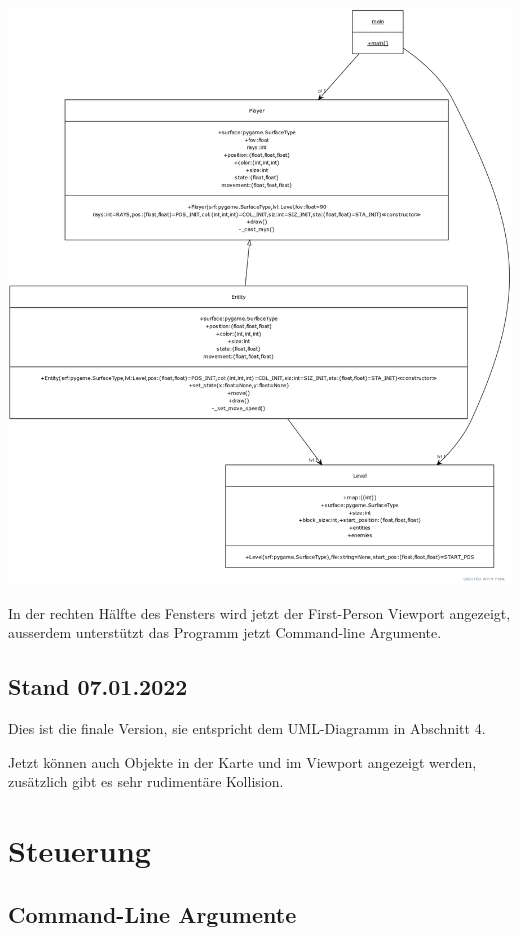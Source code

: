 \documentclass[a4paper,titlepage]{article}
\begin{document}
\includegraphics[scale=0.3]{./img/yuml-4}

In der rechten Hälfte des Fensters wird jetzt der First-Person Viewport angezeigt, ausserdem unterstützt das Programm jetzt Command-line Argumente.

\subsection{Stand 07.01.2022}

Dies ist die finale Version, sie entspricht dem UML-Diagramm in Abschnitt 4.

Jetzt können auch Objekte in der Karte und im Viewport angezeigt werden, zusätzlich gibt es sehr rudimentäre Kollision.

\newpage

\section{Steuerung}

\subsection{Command-Line Argumente}
\end{document}

